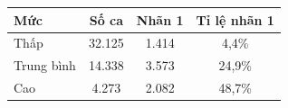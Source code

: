 \begin{tabular}{@{}lccc@{}}
\toprule
\textbf{Mức} & \textbf{Số ca} & \textbf{Nhãn 1} & \textbf{Tỉ lệ nhãn 1}\\
\midrule
Thấp & 32.125 & 1.414 & 4,4\% \\
Trung bình & 14.338 & 3.573 & 24,9\% \\
Cao & 4.273 & 2.082 & 48,7\% \\
\bottomrule
\end{tabular}

